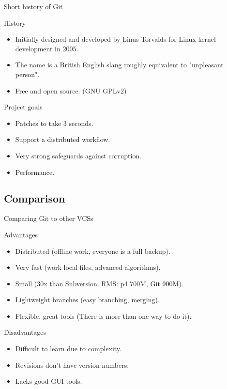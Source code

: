 \documentclass{beamer}
\begin{document}
\begin{frame}{Short history of Git}

\begin{block}{History}
\begin{itemize}
 \item Initially designed and developed by Linus Torvalds for Linux kernel development in 2005.
 \item The name is a British English slang roughly equivalent to "unpleasant person".
 \item Free and open source. (GNU GPLv2)
\end{itemize}
\end{block}

\begin{block}{Project goals}
\begin{itemize}
 \item Patches to take 3 seconds.
 \item Support a distributed workflow.
 \item Very strong safeguards against corruption.
 \item Performance.
\end{itemize}
\end{block}

\end{frame}


\subsection{Comparison}

\begin{frame}{Comparing Git to other VCSs}

\begin{block}{Advantages}
\begin{itemize}
 \item Distributed (offline work, everyone is a full backup).
 \item Very fast (work local files, advanced algorithms).
 \item Small (30x than Subversion. RMS: p4 700M, Git 900M).
 \item Lightweight branches (easy branching, merging).
 \item Flexible, great tools (There is more than one way to do it).
\end{itemize}
\end{block}

\begin{block}{Disadvantages}
\begin{itemize}
 \item Difficult to learn due to complexity.
 \item Revisions don't have version numbers.
 \item \sout{Lacks good GUI tools.}
\end{itemize}
\end{block}

\end{frame}
\end{document}
